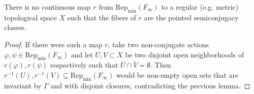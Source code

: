 \documentclass[reqno]{amsart}
\begin{document}
\begin{prop}
There is no continuous map $r$ from $\mathrm{Rep}_\mathrm{min}(F_\infty)$ to a regular (e.g. metric) topological space $X$ such that the fibers of $r$ are the pointed semiconjugacy classes.
\end{prop}

\begin{proof}
If there were such a map $r$, take two non-conjugate actions $\varphi, \psi \in \mathrm{Rep}_\mathrm{min}(F_\infty)$ and let $U, V \subset X$ be two disjoint open neighborhoods of $r(\varphi), r(\psi)$ respectively such that $\overline{U} \cap \overline{V} = \emptyset$. Then $r^{-1}(U), r^{-1}(V) \subseteq \mathrm{Rep}_\mathrm{min}(F_\infty)$ would be non-empty open sets that are invariant by $\Gamma$ and with disjoint closures, contradicting the previous lemma.
\qedhere
\end{proof}
\end{document}
